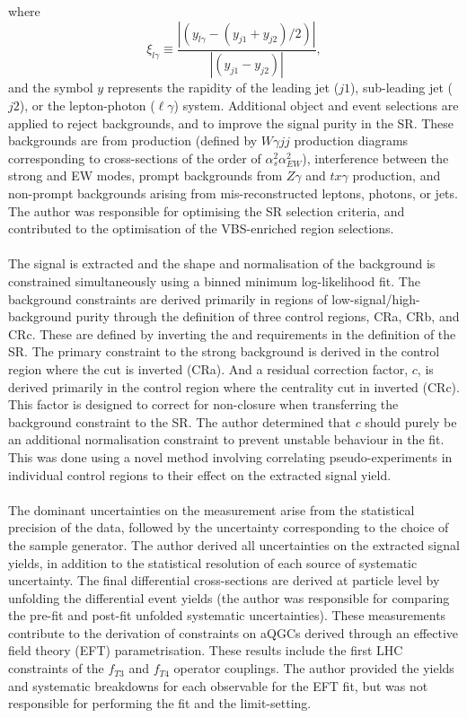 \documentclass{thesissummary}
\begin{document}
where 
\begin{equation} 
    \xi_{l\gamma}\equiv\frac{|(y_{l\gamma}-(y_{j1}+y_{j2})/2)|}{|(y_{j1}-y_{j2})|},
\end{equation}
and the symbol $y$ represents the rapidity of the leading jet ($j1$), sub-leading jet ($j2$), or the lepton-photon ($\ell\gamma$) system.
Additional object and event selections are applied to reject backgrounds, and to improve the signal purity in the SR. These backgrounds are from \qcdwy production (defined by $W\gamma jj$ production diagrams corresponding to cross-sections of the order of $\alpha_s^2\alpha_{EW}^2$), interference between the strong and EW \wyjj modes, prompt backgrounds from $Z\gamma$ and $tx\gamma$ production, and non-prompt backgrounds arising from mis-reconstructed leptons, photons, or jets. The author was responsible for optimising the SR selection criteria, and contributed to the optimisation of the VBS-enriched region selections.
\\\\
The signal is extracted and the shape and normalisation of the background is constrained simultaneously using a binned minimum log-likelihood fit. The background constraints are derived primarily in regions of low-signal/high-background purity through the definition of three control regions, CRa, CRb, and CRc. These are defined by inverting the \xily and \ngapjet requirements in the definition of the SR. The primary constraint to the strong background is derived in the control region where the \ngapjet cut is inverted (CRa). And a residual correction factor, $c$, is derived primarily in the control region where the centrality cut in inverted (CRc). This factor is designed to correct for non-closure when transferring the background constraint to the SR. The author determined that $c$ should purely be an additional normalisation constraint to prevent unstable behaviour in the fit. This was done using a novel method involving correlating pseudo-experiments in individual control regions to their effect on the extracted signal yield.
\\\\
The dominant uncertainties on the measurement arise from the statistical precision of the data, followed by the uncertainty corresponding to the choice of the \qcdwy sample generator. The author derived all uncertainties on the extracted signal yields, in addition to the statistical resolution of each source of systematic uncertainty. The final differential cross-sections are derived at particle level by unfolding the differential event yields (the author was responsible for comparing the pre-fit and post-fit unfolded systematic uncertainties). These measurements contribute to the derivation of constraints on aQGCs derived through an effective field theory (EFT) parametrisation. These results include the first LHC constraints of the $f_{T3}$ and $f_{T4}$ operator couplings. The author provided the yields and systematic breakdowns for each observable for the EFT fit, but was not responsible for performing the fit and the limit-setting.
\end{document}
